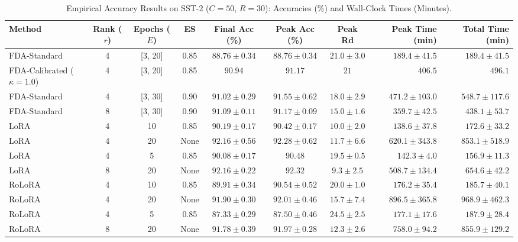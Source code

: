 \documentclass[10pt,a4paper]{article}
\begin{document}
\begin{table}[H]
\centering
\caption{Empirical Accuracy Results on SST-2 ($C=50$, $R=30$): Accuracies (\%) and Wall-Clock Times (Minutes).}
\scriptsize
\setlength{\tabcolsep}{3.5pt}
\begin{tabular*}{\textwidth}{@{\extracolsep{\fill}}lccccccrr@{}}
\toprule
\textbf{Method} & \textbf{Rank ($r$)} & \textbf{Epochs ($E$)} & \textbf{ES} & \textbf{Final Acc (\%)} & \textbf{Peak Acc (\%)} & \textbf{Peak Rd} & \textbf{Peak Time (min)} & \textbf{Total Time (min)} \\
\midrule
FDA-Standard & 4 & [3, 20] & 0.85 & $88.76 \pm 0.34$ & $88.76 \pm 0.34$ & $21.0 \pm 3.0$ & $189.4 \pm 41.5$ & $189.4 \pm 41.5$ \\
FDA-Calibrated ($\kappa=1.0$) & 4 & [3, 20] & 0.85 & $90.94$ & $91.17$ & $21$ & $406.5$ & $496.1$ \\
FDA-Standard & 4 & [3, 30] & 0.90 & $91.02 \pm 0.29$ & $91.55 \pm 0.62$ & $18.0 \pm 2.9$ & $471.2 \pm 103.0$ & $548.7 \pm 117.6$ \\
FDA-Standard & 8 & [3, 30] & 0.90 & $91.09 \pm 0.11$ & $91.17 \pm 0.09$ & $15.0 \pm 1.6$ & $359.7 \pm 42.5$ & $438.1 \pm 53.7$ \\
LoRA & 4 & 10 & 0.85 & $90.19 \pm 0.17$ & $90.42 \pm 0.17$ & $10.0 \pm 2.0$ & $\mathbf{138.6 \pm 37.8}$ & $172.6 \pm 33.2$ \\
LoRA & 4 & 20 & None & $\mathbf{92.16 \pm 0.56}$ & $92.28 \pm 0.62$ & $11.7 \pm 6.6$ & $620.1 \pm 343.8$ & $853.1 \pm 518.9$ \\
LoRA & 4 & 5 & 0.85 & $90.08 \pm 0.17$ & $90.48$ & $19.5 \pm 0.5$ & $142.3 \pm 4.0$ & $156.9 \pm 11.3$ \\
LoRA & 8 & 20 & None & $\mathbf{92.16 \pm 0.22}$ & $\mathbf{92.32}$ & $9.3 \pm 2.5$ & $508.7 \pm 134.4$ & $654.6 \pm 42.2$ \\
RoLoRA & 4 & 10 & 0.85 & $89.91 \pm 0.34$ & $90.54 \pm 0.52$ & $20.0 \pm 1.0$ & $176.2 \pm 35.4$ & $185.7 \pm 40.1$ \\
RoLoRA & 4 & 20 & None & $91.90 \pm 0.30$ & $92.01 \pm 0.46$ & $15.7 \pm 7.4$ & $896.5 \pm 365.8$ & $968.9 \pm 462.3$ \\
RoLoRA & 4 & 5 & 0.85 & $87.33 \pm 0.29$ & $87.50 \pm 0.46$ & $24.5 \pm 2.5$ & $177.1 \pm 17.6$ & $187.9 \pm 28.4$ \\
RoLoRA & 8 & 20 & None & $91.78 \pm 0.39$ & $91.97 \pm 0.28$ & $12.3 \pm 2.6$ & $758.0 \pm 94.2$ & $855.9 \pm 129.2$ \\
\bottomrule
\end{tabular*}
\end{table}
\end{document}
